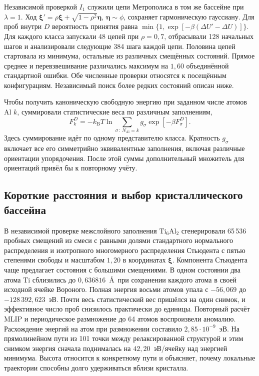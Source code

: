 Независимой проверкой $I_1$ служили цепи Метрополиса в том же бассейне при
$\lambda=1$. Ход $\boldsymbol\xi'=\rho\boldsymbol\xi+
\sqrt{1-\rho^2}\boldsymbol\eta$, $\boldsymbol\eta\sim\phi$, сохраняет
гармоническую гауссиану. Для проб внутри $D$ вероятность принятия равна
$\min\{1,\exp[-\beta(\Delta U'-\Delta U)]\}$. Для каждого класса запускали
48 цепей при $\rho=0{,}7$, отбрасывали 128 начальных шагов и анализировали
следующие 384 шага каждой цепи. Половина цепей стартовала из минимума,
остальные из различных смещённых состояний. Прямое среднее
и перевзвешивание различались максимум на $1{,}60$ объединённой
стандартной ошибки. Обе численные проверки относятся к посещённым
конфигурациям. Независимый поиск более редких состояний описан ниже.

Чтобы получить каноническую свободную энергию при заданном числе атомов Al
$k$, суммировали статистические веса по различным заполнениям,
\begin{equation}
 F_k^D=-k_{\mathrm B}T\ln
   \sum_{\sigma\,:\,N_{\mathrm{Al}}=k}g_\sigma
     \exp[-\beta F_\sigma^D] .
\end{equation}
Здесь суммирование идёт по одному представителю класса. Кратность
$g_\sigma$ включает все его симметрийно эквивалентные заполнения,
включая различные ориентации упорядочения. После этой суммы дополнительный
множитель для ориентаций привёл бы к повторному учёту.

\subsection{Короткие расстояния и выбор кристаллического бассейна}

В независимой проверке межслойного заполнения $\mathrm{Ti}_6\mathrm{Al}_2$
сгенерировали 65\,536 пробных смещений из смеси с равными долями
стандартного нормального распределения и изотропного многомерного распределения
Стьюдента с пятью степенями свободы и масштабом $1{,}20$ в координатах
$\boldsymbol\xi$. Компонента Стьюдента чаще предлагает состояния с большими
смещениями. В одном состоянии два атома Ti
сблизились до $0{,}636816$~\AA\ при сохранении каждого атома в своей исходной
ячейке Вороного. Полная энергия восьми атомов упала с $-56{,}069$ до
$-128\,392{,}623$~эВ. Почти весь статистический вес пришёлся на один снимок,
и эффективное число проб снизилось практически до единицы.
Повторный расчёт MLIP и периодическое размножение до 64 атомов воспроизвели
аномалию. Расхождение энергий на атом при размножении составило
$2{,}85\cdot10^{-9}$~эВ. На прямолинейном пути из 101 точки между релаксированной
структурой и этим снимком энергия сначала поднималась на $42{,}20$~эВ/ячейку
над энергией минимума. Высота относится к конкретному пути и объясняет, почему
локальные траектории способны долго удерживаться вблизи кристалла.

